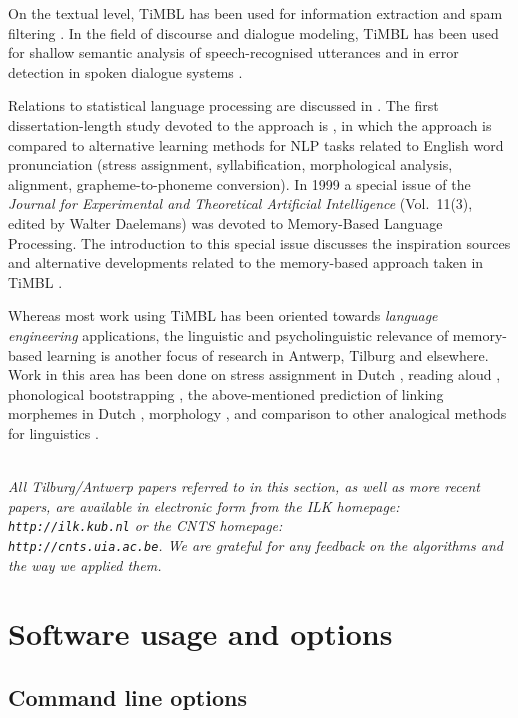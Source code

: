 \documentclass{report}
\begin{document}
On the textual level, TiMBL has been used for information extraction
\cite{Zavrel+00b} and spam filtering \cite{Androutsopoulos+00}. In the
field of discourse and dialogue modeling, TiMBL has been used for
shallow semantic analysis of speech-recognised utterances
\cite{Gustafson+99} and in error detection in spoken dialogue systems
\cite{Krahmer+01,VandenBosch+01}.

Relations to statistical language processing are discussed in
\cite{Zavrel+97}. The first
dissertation-length study devoted to the approach is
\cite{VandenBosch97}, in which the approach is compared to alternative
learning methods for NLP tasks related to English word pronunciation
(stress assignment, syllabification, morphological analysis,
alignment, grapheme-to-phoneme conversion). In 1999 a special issue of
the {\em Journal for Experimental and Theoretical Artificial
Intelligence} (Vol.~11(3), edited by Walter Daelemans) was devoted to
Memory-Based Language Processing. The introduction to this special
issue discusses the inspiration sources and alternative developments
related to the memory-based approach taken in TiMBL
\cite{Daelemans99b}.

Whereas most work using TiMBL has been oriented towards {\em language
engineering}\/ applications, the linguistic and psycholinguistic
relevance of memory-based learning is another focus of research in
Antwerp, Tilburg and elsewhere. Work in this area has been done on
stress assignment in Dutch \cite{Daelemans+94b,Gillis+00}, reading
aloud \cite{Vandenbosch+00b}, phonological bootstrapping
\cite{Durieux+00}, the above-mentioned prediction of linking morphemes
in Dutch \cite{Krott+01}, morphology \cite{Eddington00}, and
comparison to other analogical methods for linguistics
\cite{Daelemans+97f}.

\ \\

{\it All Tilburg/Antwerp papers referred to in this section, as well
as more recent papers, are available in electronic form from the {\sc
ILK} homepage: {\tt http://ilk.kub.nl} or the {\sc CNTS} homepage: \\
{\tt http://cnts.uia.ac.be}. We are grateful for any feedback on the
algorithms and the way we applied them.}

\chapter{Software usage and options}
\label{reference}

\section{Command line options}
\label{commandline}
\end{document}
